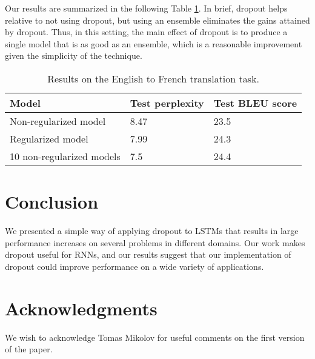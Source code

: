 \documentclass{article}
\begin{document}
Our results are summarized in the following Table \ref{tab:vis}.  In brief,
dropout helps relative to not using dropout, but using an ensemble
eliminates the gains attained by dropout.  Thus, in this setting,
the main effect of dropout is to produce a single model that is as
good as an ensemble, which is a reasonable improvement given
the simplicity of the technique.  
\begin{table}[t]
  \small
  \centering
  \renewcommand{\arraystretch}{1.15}
  \begin{tabular}{lll}
    \hline
     Model & Test perplexity & Test BLEU score \\
    \hline
    Non-regularized model & 8.47 & 23.5 \\
    Regularized model & 7.99 &  24.3 \\
    \hline
    10 non-regularized models  & 7.5  &  24.4 \\
    \hline
  \end{tabular}
  \caption{Results on the English to French translation task. }
  \label{tab:vis}
\end{table}



\section{Conclusion}

We presented a simple way of applying dropout to LSTMs that results in
large performance increases on several problems in different domains.
Our work makes dropout useful for RNNs, and our results suggest that
our implementation of dropout could improve performance on a wide
variety of applications.

\section{Acknowledgments}

We wish to acknowledge Tomas Mikolov for useful comments on the first version of the paper.   

\small


\end{document}
